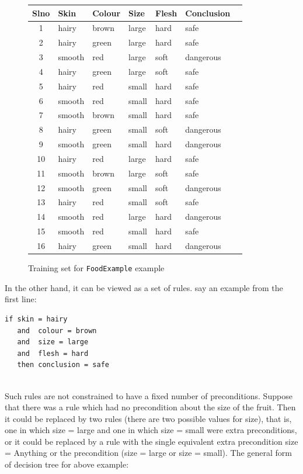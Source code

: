 \documentclass{report}
\begin{document}
\begin{figure}[h]
  \centering
  \begin{tabular}{|c|l|l|l|l|l|l|}
    \hline
   Slno & Skin	& Colour & Size & Flesh & Conclusion\\
    \hline
    1 & hairy &	brown &	large &	hard & safe	
    \\\hline
    2 & hairy & green & large & hard & safe
    \\\hline
    3 & smooth & red & large & soft & dangerous
    \\\hline
    4 & hairy & green & large & soft & safe	
    \\\hline
    5 & hairy &	red & small	& hard	& safe
    \\\hline
    6 & smooth & red & small & hard & safe	
    \\\hline
    7 & smooth & brown & small & hard &	safe	
    \\\hline
    8 & hairy &	green &	small &	soft & dangerous	
    \\\hline
    9 & smooth & green & small & hard &	dangerous
    \\\hline
    10 & hairy & red & large & hard & safe
    \\\hline
    11 & smooth & brown & large & soft & safe	
    \\\hline
    12 & smooth	& green & small	& soft	& dangerous
    \\\hline
    13 & hairy	& red & small & soft & safe	
    \\\hline
    14 & smooth	& red &	large &	hard & dangerous
    \\\hline
    15 & smooth & red & small &	hard & safe
    \\\hline
    16 & hairy & green & small & hard & dangerous		
    \\\hline               
                     
  \end{tabular}
  \caption{Training set for \texttt{FoodExample} example}
  \label{fig:foodexample}
\end{figure}

In the other hand, it can be viewed as a set of rules. say an example from the first line:
 

\begin{lstlisting}
if skin = hairy
   and  colour = brown
   and  size = large
   and  flesh = hard
   then conclusion = safe    
    
\end{lstlisting}
Such rules are not constrained to have a fixed number of preconditions. Suppose that there was a rule which had no precondition about the size of the fruit. Then it could be replaced by two rules (there are two possible values for size), that is, one in which size = large and one in which size = small were extra preconditions, or it could be replaced by a rule with the single equivalent extra precondition size = Anything or the precondition (size = large or size = small).
The general form of decision tree for above example:
\end{document}

